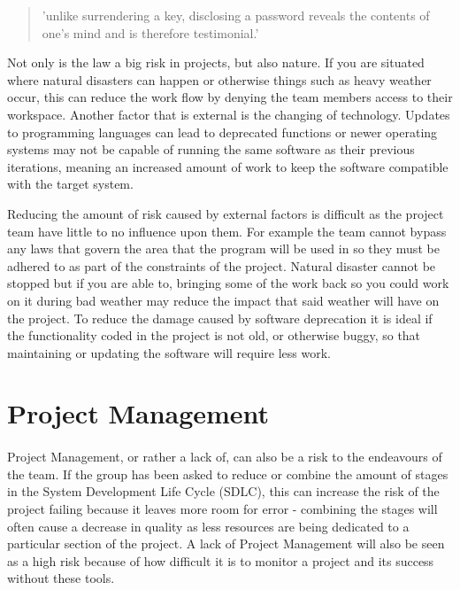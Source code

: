 \begin{quote}
'unlike surrendering a key, disclosing a password reveals the contents of one’s mind and
is therefore testimonial.' \cite{usCryptLaw}
\end{quote}

Not only is the law a big risk in projects, but also nature.  If you are
situated where natural disasters can happen or otherwise things such as heavy
weather occur, this can reduce the work flow by denying the team members access
to their workspace.  Another factor that is external is the changing of
technology.  Updates to programming languages can lead to deprecated functions
or newer operating systems may not be capable of running the same software as
their previous iterations, meaning an increased amount of work to keep the
software compatible with the target system.

Reducing the amount of risk caused by external factors is difficult as the
project team have little to no influence upon them.  For example the team cannot
bypass any laws that govern the area that the program will be used in so they
must be adhered to as part of the constraints of the project.  Natural disaster
cannot be stopped but if you are able to, bringing some of the work back so you
could work on it during bad weather may reduce the impact that said weather will
have on the project.  To reduce the damage caused by software deprecation it is
ideal if the functionality coded in the project is not old, or otherwise buggy,
so that maintaining or updating the software will require less work.

\section{Project Management}
\paragraph{}

Project Management, or rather a lack of, can also be a risk to the endeavours of
the team.  If the group has been asked to reduce or combine the amount of stages
in the System Development Life Cycle (SDLC), this can increase the risk of the
project failing because it leaves more room for error - combining the stages
will often cause a decrease in quality as less resources are being dedicated to
a particular section of the project.  A lack of Project Management will also be
seen as a high risk because of how difficult it is to monitor a project and its
success without these tools.

